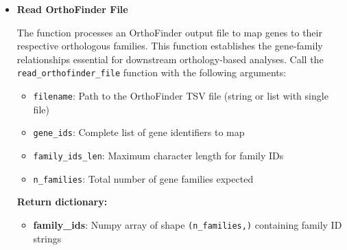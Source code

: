 \begin{enumerate}
\begin{itemize}
                  \textbf{Returns:}
                  \begin{itemize}
                    \item \textbf{expression\_vectors}: 2D numpy array of shape \texttt{(n\_samples,
                          n\_genes)} containing expression values as 64-bit floats
                  \end{itemize}
                  
                  \begin{lstlisting}[language=Python, caption={Python Read Expression Vectors}]
expression_vectors = read_expression_vectors(file_list, gene_ids, 
                                n_samples, n_header_rows, gene_col, 
                                value_cols, delimiter='\t')
                  \end{lstlisting}
                  
            \item \textbf{Read OrthoFinder File}
                  
                  The function processes an OrthoFinder output file to map genes to their
                  respective orthologous families. This function establishes the gene-family
                  relationships essential for downstream orthology-based analyses. Call the
                  \texttt{read\_orthofinder\_file} function with the following arguments:
                  
                  \begin{itemize}
                    \item \texttt{filename}: Path to the OrthoFinder TSV file (string or
                          list with single file)
                          
                    \item \texttt{gene\_ids}: Complete list of gene identifiers to map
                          
                    \item \texttt{family\_ids\_len}: Maximum character length for family
                          IDs
                          
                    \item \texttt{n\_families}: Total number of gene families expected
                  \end{itemize}
                  
                  \textbf{Return dictionary:}
                  \begin{itemize}
                    \item \textbf{family\_ids}: Numpy array of shape \texttt{(n\_families,)}
                          containing family ID strings
                          

\end{itemize}
\end{itemize}
\end{enumerate}
